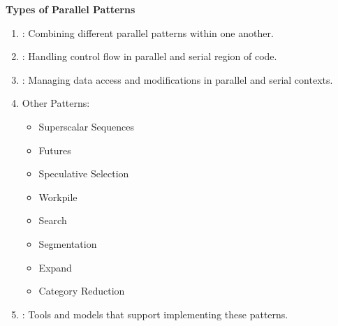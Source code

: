 \highspace
\begin{flushleft}
    \textcolor{Green3}{ \textbf{Types of Parallel Patterns}}
\end{flushleft}
\begin{enumerate}
    \item {}: Combining different parallel patterns within one another.
    \item {}: Handling control flow in parallel and serial region of code.
    \item {}: Managing data access and modifications in parallel and serial contexts.
    \item Other Patterns:
    \begin{multicols}{2}
        \begin{itemize}
            \item Superscalar Sequences
            \item Futures
            \item Speculative Selection
            \item Workpile
            \item Search
            \item Segmentation
            \item Expand
            \item Category Reduction
        \end{itemize}
    \end{multicols}
    \item {}: Tools and models that support implementing these patterns.
\end{enumerate}
